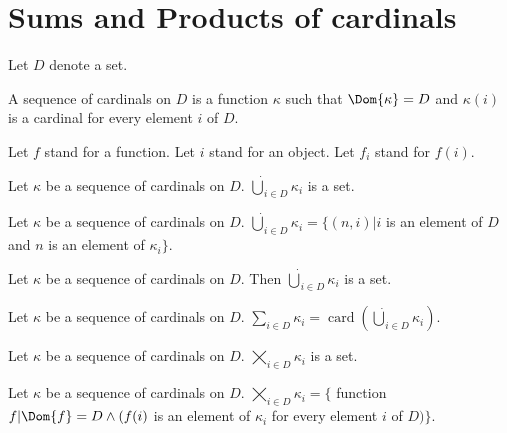 \documentclass{article}
\newcommand{\val}[2]{#1_{#2}}
\newcommand{\card}[1]{\operatorname{card}(#1)}
\begin{document}
\section{Sums and Products of cardinals}

\newcommand{\SumSet}[2]{{\dot{\bigcup}}_{i \in #2} \val{#1}{i}}
\newcommand{\Sum}[2]{{\sum}_{i \in #2} \val{#1}{i}}
\newcommand{\ProdSet}[2]{{\bigtimes}_{i \in #2} \val{#1}{i}}
\newcommand{\Prod}[2]{{\prod}_{i \in #2} \val{#1}{i}}

  \begin{forthel}
    Let $D$ denote a set.

    \begin{definition}
      A sequence of cardinals on $D$ is a function $\kappa$
      such that $\Dom{\kappa} = D$
      and $\kappa(i)$ is a cardinal for every element $i$ of $D$.
    \end{definition}

    Let $f$ stand for a function.
    Let $i$ stand for an object.
    Let $\val{f}{i}$ stand for $f(i)$.

    \begin{signature}
      Let $\kappa$ be a sequence of cardinals on $D$.
     $\SumSet{\kappa}{D}$ is a set.
    \end{signature}

    \begin{axiom}[SumDef]
      Let $\kappa$ be a sequence of cardinals on $D$. $\SumSet{\kappa}{D} =
      \{(n,i) | i$ is an element of $D$ and $n$ is an element
      of $\val{\kappa}{i}\}$.
    \end{axiom}

    \begin{axiom}
      Let $\kappa$ be a sequence of cardinals on $D$.
      Then $\SumSet{\kappa}{D}$ is a set.
    \end{axiom}

    \begin{definition}
      Let $\kappa$ be a sequence of cardinals on $D$.
      $\Sum{\kappa}{D} = \card{\SumSet{\kappa}{D}}$.
    \end{definition}

    \begin{signature}
      Let $\kappa$ be a sequence of cardinals on $D$.
      $\ProdSet{\kappa}{D}$ is a set.
    \end{signature}

    \begin{axiom}[ProdDef]
      Let $\kappa$ be a sequence of cardinals on $D$. $\ProdSet{\kappa}{D} =
      \{$ function $f | \Dom{f} = D \wedge (f(i)$ is an element of
      $\val{\kappa}{i}$ for every
      element $i$ of $D)\}$.
    \end{axiom}


\end{forthel}
\end{document}
